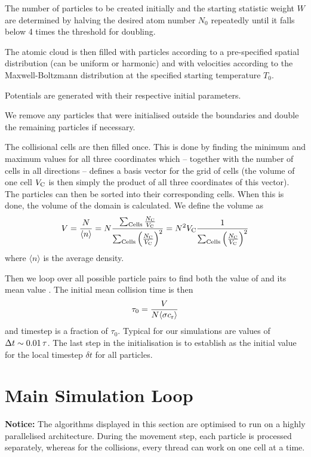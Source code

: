 The number of particles to be created initially and the starting statistic weight $W$ are determined by halving the desired atom number $N_0$ repeatedly until it falls below 4 times the threshold for doubling.

The atomic cloud is then filled with particles according to a pre-specified spatial distribution (can be uniform or harmonic) and with velocities according to the Maxwell-Boltzmann distribution at the specified starting temperature $T_0$.

Potentials are generated with their respective initial parameters.

We remove any particles that were initialised outside the boundaries and double the remaining particles if necessary.

The collisional cells are then filled once. This is done by finding the minimum and maximum values for all three coordinates which -- together with the number of cells in all directions -- defines a basis vector for the grid of cells (the volume of one cell $V_\text{C}$ is then simply the product of all three coordinates of this vector). The particles can then be sorted into their corresponding cells. When this is done, the volume of the domain is calculated. We define the volume as
\begin{equation*}
    V = \frac{N}{\langle n\rangle} = N \frac{\sum_\text{Cells} \frac{N_\text{C}}{V_\text{C}}}{\sum_\text{Cells} \left(\frac{N_\text{C}}{V_\text{C}}\right)^2} = N^2V_\text{C} \frac{1}{\sum_\text{Cells} \left(\frac{N_\text{C}}{V_\text{C}}\right)^2}
\end{equation*}
where $\langle n\rangle$ is the average density.

Then we loop over all possible particle pairs to find both the value of \maxProb and its mean value \meanProb. The initial mean collision time is then
\begin{equation*}
    \tau_0 = \frac{V}{N\langle\sigma c_\text{r}\rangle}
\end{equation*}
and timestep \Dt is a fraction of $\tau_0$. Typical for our simulations are values of $\Delta t \sim \num{0.01}\,\tau$. The last step in the initialisation is to establish \Dt as the initial value for the local timestep $\delta t$ for all particles.
%

\section{Main Simulation Loop}
\textbf{Notice:} The algorithms displayed in this section are optimised to run on a highly parallelised architecture. During the movement step, each particle is processed separately, whereas for the collisions, every thread can work on one cell at a time.


